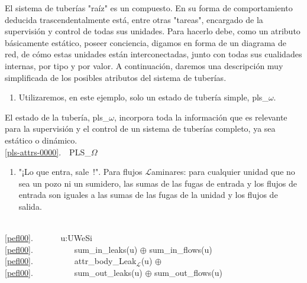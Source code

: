 
\begynd
\pind El sistema de tuberías "raíz" es un compuesto.
\pind En su forma de comportamiento deducida trascendentalmente
\begynd
\pind está, entre otras "tareas", encargado de la supervisión
      y control de todas sus unidades.
\begynd
\pind Para hacerlo debe, como un atributo básicamente estático,
\pind poseer conciencia, digamos en forma de un diagrama de red,
\begynd
\pind de cómo estas unidades están interconectadas,
\pind junto con todas sus cualidades internas,
\pind por tipo y por valor.
\afslut
\afslut
\pind A continuación, daremos una descripción muy simplificada de los posibles
      atributos del sistema de tuberías.
\afslut
      
\mnewfoil
\begin{enumerate}\setei
\item \label{pls-attrs-0000} Utilizaremos, en este ejemplo, 
  solo un estado de tubería simple, \textsf{pls\_$\omega$}.
\savei\end{enumerate}

\noindent
\begynd
\pind El estado de la tubería, \textsf{pls\_$\omega$}, incorpora toda la
      información que es relevante para la supervisión y el control de un
      sistema de tuberías completo, ya sea estático o dinámico.
\afslut
\bp
{}\\
\ref{pls-attrs-0000}.\ \ PLS\_$\Omega$ 
\ep


\begin{enumerate}\setei
\item \label{pefl00} "¡Lo que entra, sale~!". Para flujos $\mathcal{L}$aminares: para cualquier unidad que no sea un pozo ni un sumidero,
                     las sumas de las fugas de entrada y los flujos de entrada son iguales a
                     las sumas de las fugas de la unidad y los flujos de salida.
\savei\end{enumerate}
\bp
\>\ \\
\ref{pefl00}.\ \ \ \ \ \ {\ALL} u:U{\SETMINUS}We{\SETMINUS}Si {\RDOT} \\
\ref{pefl00}.\ \ \ \ \ \ \ \ \ \ sum\_in\_leaks(u) $\oplus$ sum\_in\_flows(u) {\EQ}\\
\ref{pefl00}.\ \ \ \ \ \ \ \ \ \ attr\_body\_Leak$_{\mathcal{L}}$(u) $\oplus$ \\
\ref{pefl00}.\ \ \ \ \ \ \ \ \ \ sum\_out\_leaks(u) $\oplus$ sum\_out\_flows(u)
\ep

